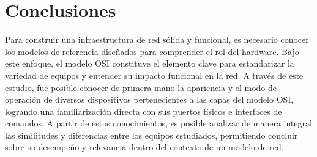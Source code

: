 \section{Conclusiones}
Para construir una infraestructura de red sólida
y funcional, es necesario conocer los modelos de
referencia diseñados para comprender el rol del
hardware. Bajo este enfoque, el modelo OSI
constituye el elemento clave para estandarizar
la variedad de equipos y entender su impacto
funcional en la red.
\medskip
A través de este estudio, fue posible conocer de
primera mano la apariencia y el modo de operación
de diversos dispositivos pertenecientes a las capas
del modelo OSI, logrando una familiarización directa
con sus puertos físicos e interfaces de comandos. A 
partir de estos conocimientos, es posible analizar 
de manera integral las similitudes y diferencias 
entre los equipos estudiados, permitiendo concluir 
sobre su desempeño y relevancia dentro del contexto 
de un modelo de red.
\bigskip

